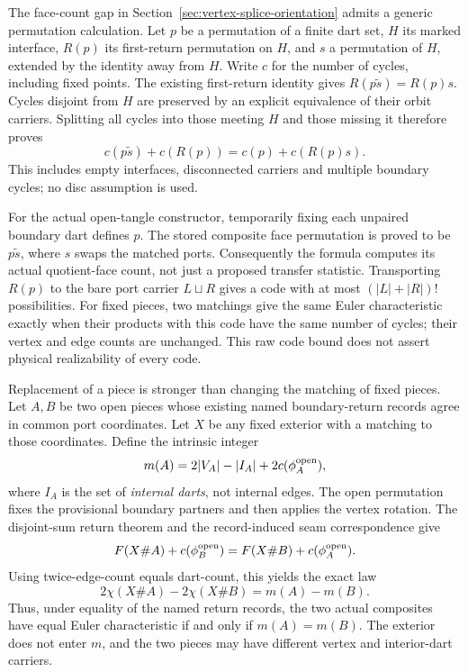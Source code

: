 The face-count gap in Section~\ref{sec:vertex-splice-orientation} admits
a generic permutation calculation. Let $p$ be a permutation of a finite
dart set, $H$ its marked interface, $R(p)$ its first-return permutation
on $H$, and $s$ a permutation of $H$, extended by the identity away from
$H$. Write $c$ for the number of cycles, including fixed points. The
existing first-return identity gives $R(p\widetilde{s})=R(p)s$.
Cycles disjoint from $H$ are preserved by an explicit equivalence of
their orbit carriers. Splitting all cycles into those meeting $H$ and
those missing it therefore proves
\[
 c(p\widetilde{s})+c(R(p))=c(p)+c(R(p)s).
\]
This includes empty interfaces, disconnected carriers and multiple
boundary cycles; no disc assumption is used.

For the actual open-tangle constructor, temporarily fixing each unpaired
boundary dart defines $p$. The stored composite face permutation is
proved to be $p\widetilde{s}$, where $s$ swaps the matched ports.
Consequently the formula computes its actual quotient-face count, not
just a proposed transfer statistic.
Transporting $R(p)$ to the bare port carrier $L\sqcup R$ gives a code
with at most $(|L|+|R|)!$ possibilities. For fixed pieces, two matchings
give the same Euler characteristic exactly when their products with
this code have the same number of cycles; their vertex and edge counts
are unchanged. This raw code bound does not assert physical realizability
of every code.

Replacement of a piece is stronger than changing the matching of fixed
pieces. Let $A,B$ be two open pieces whose existing named boundary-return
records agree in common port coordinates. Let $X$ be any fixed exterior
with a matching to those coordinates. Define the intrinsic integer
\[
 m(A)=2|V_A|-|I_A|+2c(\phi_A^{\rm open}),
\]
where $I_A$ is the set of \emph{internal darts}, not internal edges.
The open permutation fixes the provisional boundary partners and then
applies the vertex rotation. The disjoint-sum return theorem and the
record-induced seam correspondence give
\[
 F(X\# A)+c(\phi_B^{\rm open})
   =F(X\# B)+c(\phi_A^{\rm open}).
\]
Using twice-edge-count equals dart-count, this yields the exact law
\[
 2\chi(X\# A)-2\chi(X\# B)=m(A)-m(B).
\]
Thus, under equality of the named return records, the two actual
composites have equal Euler characteristic if and only if $m(A)=m(B)$.
The exterior does not enter $m$, and the two pieces may have different
vertex and interior-dart carriers.

